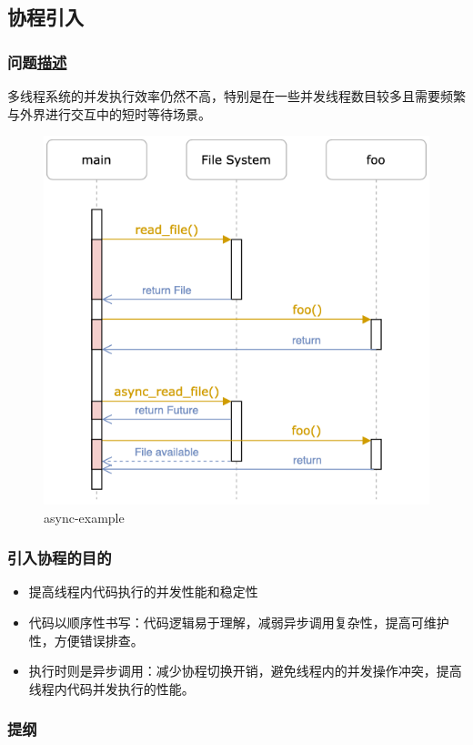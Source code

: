 \subsection{协程引入}
% 
\begin{frame}[fragile]
    \frametitle{问题\href{https://os.phil-opp.com/async-await/\#example}{描述}}
% 
多线程系统的并发执行效率仍然不高，特别是在一些并发线程数目较多且需要频繁与外界进行交互中的短时等待场景。
% 

  \begin{figure}
    \centering
    \includegraphics[width=0.35\linewidth]{figs/async-example.png}
    \caption{async-example}
  \end{figure}



% 

\end{frame}
\begin{frame}[fragile]
    \frametitle{引入协程的目的}

    \begin{itemize}
        \item 提高线程内代码执行的并发性能和稳定性
        \item 代码以顺序性书写：代码逻辑易于理解，减弱异步调用复杂性，提高可维护性，方便错误排查。
        \item 执行时则是异步调用：减少协程切换开销，避免线程内的并发操作冲突，提高线程内代码并发执行的性能。
    \end{itemize}
\end{frame}
% 
\begin{frame}
\frametitle{提纲} %
\tableofcontents %
\end{frame}
